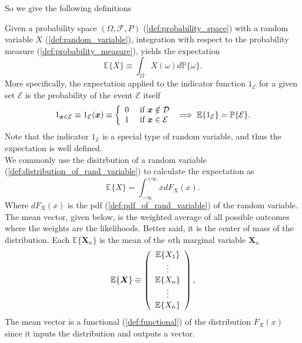 \documentclass[../main.tex]{subfiles}
\begin{document}
So we give the following definitions


\begin{definition}
Given a probability space $(\Omega, \mathcal{F}, P)$ (\ref{def:probability_space}) with a random variable $X$ (\ref{def:random_variable}), integration with respect to the probability measure (\ref{def:probability_measure}), yields the expectation
\begin{equation}
    \mathbb{E}\{X\}\equiv\int_{\Omega}X(\omega)d\mathbb{P}\{\omega\}\text{.}
\end{equation}
More specifically, the expectation applied to the indicator function $1_\mathcal{E}$ for a given set $\mathcal{E}$ is the probability of the event $\mathcal{E}$ itself
\[
    1_{\boldsymbol{x}\in\mathcal{E}}\equiv1_{\mathcal{E}}(\boldsymbol{x})\equiv\left\{ \begin{array}
    [c]{ll}0 & \text{ if }\boldsymbol{x}\notin\mathcal{D}\\
    1 & \text{ if }\boldsymbol{x}\in\mathcal{E}
    \end{array} \right. \implies \mathbb{E}\{1_{\mathcal{E}}\}=\mathbb{P}\{\mathcal{E}\}\text{.}
\]
Note that the indicator $1_\mathcal{E}$ is a special type of random variable, and thus the expectation is well defined. \\
We commonly use the disitrbution of a random variable (\ref{def:distribution_of_rand_variable}) to calculate the expectation as 
\begin{equation}
    \mathbb{E}\{X\}=\int\nolimits_{-\infty}^{+\infty}xdF_{X}(x)\text{.}
\end{equation}
Where $dF_{X}(x)$ is the pdf (\ref{def:pdf_of_rand_variable}) of the random variable.\\
The mean vector, given below, is the weighted average of all possible outcomes where the weights are the likelihoods. Better said, it is the center of mass of the distribution. Each $\mathbb{E}\{\mathbf{X}_n\}$ is the mean of the $n$th marginal variable $\mathbf{X}_n$
\begin{equation}
    \mathbb{E}\{\boldsymbol{X}\}\equiv\left( \begin{array}
    [c]{c}\mathbb{E}\{X_{1}\}\\
    \vdots\\
    \mathbb{E}\{X_{n}\}\\
    \vdots\\
    \mathbb{E}\{X_{\bar{n}}\}
    \end{array} \right) \text{,}
    \end{equation}
The mean vector is a functional (\ref{def:functional}) of the distribution $F_{X}(x)$ since it inputs the distribution and outputs a vector. 
\end{definition}
\end{document}
